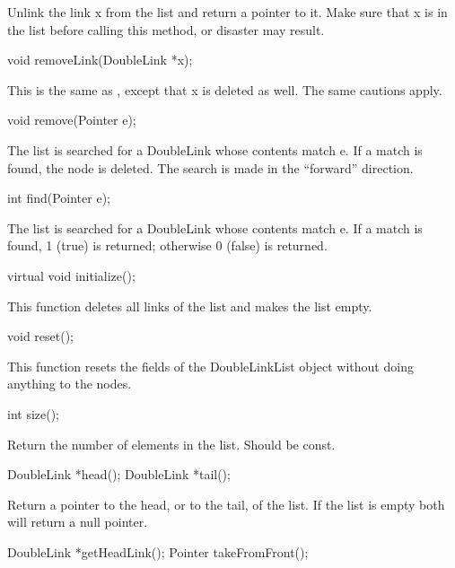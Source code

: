 Unlink the link x from the list and return a pointer to it.
Make sure that x is in the list before calling this method,
or disaster may result.

\begin{example}
void removeLink(DoubleLink *x);
\end{example}

This is the same as , except that x is deleted
as well.  The same cautions apply.

\begin{example}
void remove(Pointer e);
\end{example}

The list is searched for a DoubleLink whose contents match e.  If
a match is found, the node is deleted.  The search is made in the
``forward'' direction.

\begin{example}
int find(Pointer e);
\end{example}

The list is searched for a DoubleLink whose contents match e.  If
a match is found, 1 (true) is returned; otherwise 0 (false) is
returned.

\begin{example}
virtual void initialize();
\end{example}

This function deletes all links of the list and makes the list empty.

\begin{example}
void reset();
\end{example}

This function resets the fields of the DoubleLinkList object without
doing anything to the nodes.

\begin{example}
int size();
\end{example}

Return the number of elements in the list.  Should be const.

\begin{example}
DoubleLink *head();
DoubleLink *tail();
\end{example}

Return a pointer to the head, or to the tail, of the list.  If
the list is empty both will return a null pointer.

\begin{example}
DoubleLink *getHeadLink();
Pointer takeFromFront();
\end{example}

